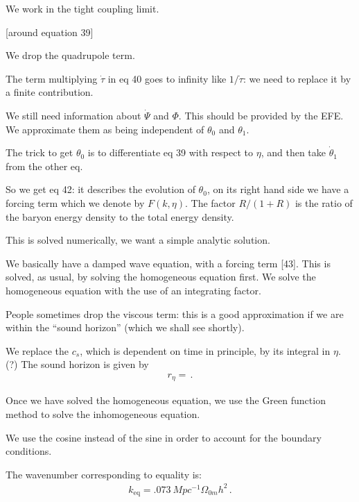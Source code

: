 \documentclass[main.tex]{subfiles}
\begin{document}

We work in the tight coupling limit. 

[around equation 39]

We drop the quadrupole term.

The term multiplying \(\dot{\tau}\) in eq 40 goes to infinity like \(1/ \dot{\tau}\):  we need to replace it by a finite contribution. 

We still need information about \(\dot{\Psi}\) and \(\Phi \). 
This should be provided by the EFE. We approximate them as being independent of \(\theta_0 \) and \(\theta_1 \). 

The trick to get \(\theta_0 \) is to differentiate eq 39 with respect to \(\eta \), and then take \(\dot{\theta}_{1} \) from the other eq.  

So we get eq 42: it describes the evolution of \(\theta_0 \), on its right hand side we have a forcing term which we denote by \(F(k, \eta )\). 
The factor \(R / ( 1+ R)\) is the ratio of the baryon energy density to the total energy density.

This is solved numerically, we want a simple analytic solution. 

We basically have a damped wave equation, with a forcing term [43]. This is solved, as usual, by solving the homogeneous equation first. 
We solve the homogeneous equation with the use of an integrating factor. 

People sometimes drop the viscous term: this is a good approximation if we are within the ``sound horizon'' (which we shall see shortly). 

We replace the \(c_s\), which is dependent on time in principle, by its integral in \(\eta \). (?)
The sound horizon is given by 
%
\begin{align}
r_\eta = 
\,.
\end{align}

Once we have solved the homogeneous equation, we use the Green function method to solve the inhomogeneous equation. 

We use the cosine instead of the sine in order to account for the boundary conditions. 

The wavenumber corresponding to equality is:
%
\begin{align}
k _{\text{eq}} = \num{.073} \SI{}{Mpc^{-1}} \Omega_{0m} h^2
\,.
\end{align}
\end{document}
